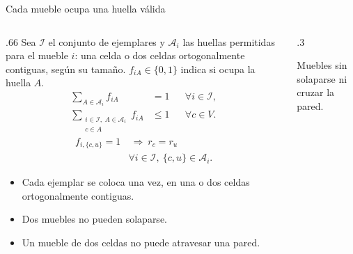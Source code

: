 \documentclass[aspectratio=169,11pt]{beamer}
\newcommand{\examplegrid}{%
  \draw[step=1,ink!35] (0,0) grid (4,4);
  \draw[ink,thick] (0,0) rectangle (4,4);
}
\begin{document}
\begin{frame}{Cada mueble ocupa una huella v\'alida}
  \begin{columns}[T,onlytextwidth]
  \begin{column}{.66\textwidth}
  \small
  Sea \(\mathcal I\) el conjunto de ejemplares y \(\mathcal A_i\)
  las huellas permitidas para el mueble \(i\): una celda o dos
  celdas ortogonalmente contiguas, seg\'un su tama\~no.
  \(f_{iA}\in\{0,1\}\) indica si ocupa la huella \(A\).
  \[
    \begin{aligned}
      \sum_{A\in\mathcal A_i}f_{iA}&=1 &&\forall i\in\mathcal I,\\
      \sum_{\substack{i\in\mathcal I,\ A\in\mathcal A_i\\c\in A}}f_{iA}
        &\leq1 &&\forall c\in V.
    \end{aligned}
  \]
  \[
    \begin{aligned}
      f_{i,\{c,u\}}=1&\ \Longrightarrow\ r_c=r_u\\
      &\forall i\in\mathcal I,\ \{c,u\}\in\mathcal A_i.
    \end{aligned}
  \]
  \begin{itemize}
    \setlength{\itemsep}{2mm}
    \item Cada ejemplar se coloca una vez, en una o dos celdas
      ortogonalmente contiguas.
    \item Dos muebles no pueden solaparse.
    \item Un mueble de dos celdas no puede atravesar una pared.
  \end{itemize}
  \end{column}
  \begin{column}{.3\textwidth}
    \centering
    \par\smallskip\scriptsize Muebles sin solaparse ni cruzar la pared.
  \end{column}
  \end{columns}
\end{frame}
\end{document}
